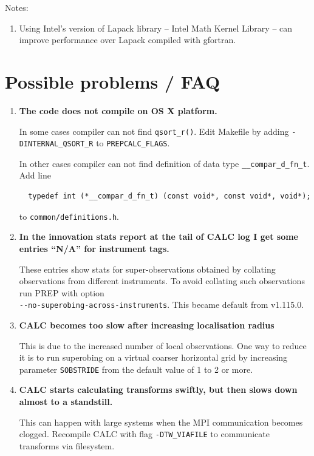 \documentclass[11pt]{report}
\begin{document}
Notes:
\vspace{-3mm}
\begin{enumerate}
\item Using Intel's version of Lapack library -- Intel Math Kernel Library -- can improve performance over Lapack compiled with gfortran.
\end{enumerate}

\section{Possible problems / FAQ}

\begin{enumerate}

\item{\bf The code does not compile on OS X platform.}

In some cases compiler can not find \verb|qsort_r()|.
Edit Makefile by adding \verb|-DINTERNAL_QSORT_R| to \verb|PREPCALC_FLAGS|.

In other cases compiler can not find definition of data type \verb|__compar_d_fn_t|.
Add line
\begin{Verbatim}
  typedef int (*__compar_d_fn_t) (const void*, const void*, void*);
\end{Verbatim}
to \verb|common/definitions.h|.

\item{\bf In the innovation stats report at the tail of CALC log I get some entries ``N/A'' for instrument tags.}

These entries show stats for super-observations obtained by collating observations from different instruments.
To avoid collating such observations run PREP with option \\\verb|--no-superobing-across-instruments|.
This became default from v1.115.0.

\item{\bf CALC becomes too slow after increasing localisation radius}

This is due to the increased number of local observations.
One way to reduce it is to run superobing on a virtual coarser horizontal grid by increasing parameter \verb|SOBSTRIDE| from the default value of 1 to 2 or more.

\item{\bf CALC starts calculating transforms swiftly, but then slows down almost to a standstill.}

This can happen with large systems when the MPI communication becomes clogged.
Recompile CALC with flag \verb|-DTW_VIAFILE| to communicate transforms via filesystem.


\end{enumerate}
\end{document}

